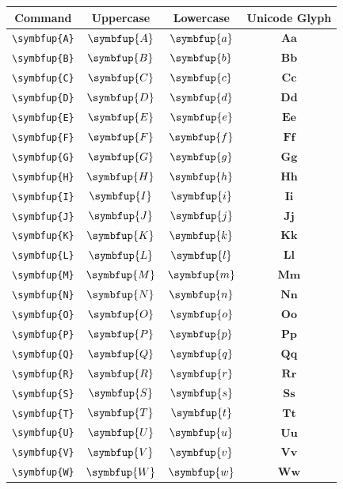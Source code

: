 \documentclass[12pt,a4paper]{article}
\begin{document}
\begin{longtable}{|c|c|c|c|}
\hline
\textbf{Command} & \textbf{Uppercase} & \textbf{Lowercase} & \textbf{Unicode Glyph} \\
\hline
\verb|\symbfup{A}| & $\symbfup{A}$ & $\symbfup{a}$ & $ 𝐀 𝐚 $ \\
\verb|\symbfup{B}| & $\symbfup{B}$ & $\symbfup{b}$ & $ 𝐁 𝐛 $ \\
\verb|\symbfup{C}| & $\symbfup{C}$ & $\symbfup{c}$ & $ 𝐂 𝐜 $ \\
\verb|\symbfup{D}| & $\symbfup{D}$ & $\symbfup{d}$ & $ 𝐃 𝐝 $ \\
\verb|\symbfup{E}| & $\symbfup{E}$ & $\symbfup{e}$ & $ 𝐄 𝐞 $ \\
\verb|\symbfup{F}| & $\symbfup{F}$ & $\symbfup{f}$ & $ 𝐅 𝐟 $ \\
\verb|\symbfup{G}| & $\symbfup{G}$ & $\symbfup{g}$ & $ 𝐆 𝐠 $ \\
\verb|\symbfup{H}| & $\symbfup{H}$ & $\symbfup{h}$ & $ 𝐇 𝐡 $ \\
\verb|\symbfup{I}| & $\symbfup{I}$ & $\symbfup{i}$ & $ 𝐈 𝐢 $ \\
\verb|\symbfup{J}| & $\symbfup{J}$ & $\symbfup{j}$ & $ 𝐉 𝐣 $ \\
\verb|\symbfup{K}| & $\symbfup{K}$ & $\symbfup{k}$ & $ 𝐊 𝐤 $ \\
\verb|\symbfup{L}| & $\symbfup{L}$ & $\symbfup{l}$ & $ 𝐋 𝐥 $ \\
\verb|\symbfup{M}| & $\symbfup{M}$ & $\symbfup{m}$ & $ 𝐌 𝐦 $ \\
\verb|\symbfup{N}| & $\symbfup{N}$ & $\symbfup{n}$ & $ 𝐍 𝐧 $ \\
\verb|\symbfup{O}| & $\symbfup{O}$ & $\symbfup{o}$ & $ 𝐎 𝐨 $ \\
\verb|\symbfup{P}| & $\symbfup{P}$ & $\symbfup{p}$ & $ 𝐏 𝐩 $ \\
\verb|\symbfup{Q}| & $\symbfup{Q}$ & $\symbfup{q}$ & $ 𝐐 𝐪 $ \\
\verb|\symbfup{R}| & $\symbfup{R}$ & $\symbfup{r}$ & $ 𝐑 𝐫 $ \\
\verb|\symbfup{S}| & $\symbfup{S}$ & $\symbfup{s}$ & $ 𝐒 𝐬 $ \\
\verb|\symbfup{T}| & $\symbfup{T}$ & $\symbfup{t}$ & $ 𝐓 𝐭 $ \\
\verb|\symbfup{U}| & $\symbfup{U}$ & $\symbfup{u}$ & $ 𝐔 𝐮 $ \\
\verb|\symbfup{V}| & $\symbfup{V}$ & $\symbfup{v}$ & $ 𝐕 𝐯 $ \\
\verb|\symbfup{W}| & $\symbfup{W}$ & $\symbfup{w}$ & $ 𝐖 𝐰 $ \\

\end{longtable}
\end{document}
